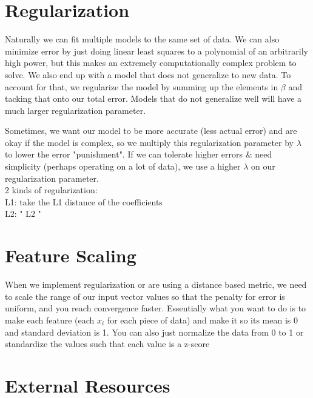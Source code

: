 \documentclass{article}
\begin{document}
\section{Regularization}
Naturally we can fit multiple models to the same set of data. We can also minimize error by just doing linear least squares to a polynomial of an arbitrarily high power, but this makes an extremely computationally complex problem to solve. We also end up with a model that does not generalize to new data. To account for that, we regularize the model by summing up the elements in $\beta$ and tacking that onto our total error. Models that do not generalize well will have a much larger regularization parameter. 

Sometimes, we want our model to be more accurate (less actual error) and are okay if the model is complex, so we multiply this regularization parameter by $\lambda$ to lower the error "punishment". If we can tolerate higher errors & need simplicity (perhaps operating on a lot of data), we use a higher $\lambda$ on our regularization parameter. \\

2 kinds of regularization:\\
L1: take the L1 distance of the coefficients\\
L2:    "     L2             "
\section{Feature Scaling}
When we implement regularization or are using a distance based metric, we need to scale the range of our input vector values so that the penalty for error is uniform, and you reach convergence faster. Essentially what you want to do is to make each feature (each $x_i$ for each piece of data) and make it so its mean is 0 and standard deviation is 1. You can also just normalize the data from 0 to 1 or standardize the values such that each value is a z-score
\section{External Resources}
\end{document}
